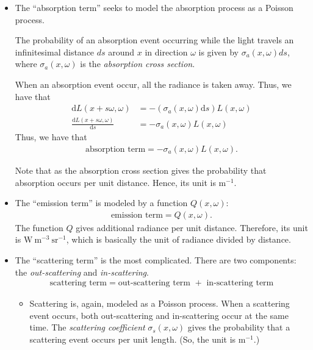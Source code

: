 \documentclass[10pt]{article}
\newcommand{\dee}{\mathrm{d}}
\begin{document}
\begin{itemize}
		\item The ``absorption term'' seeks to model the absorption process as a Poisson process.

			The probability of an absorption event occurring while the light travels an infinitesimal distance
			$ds$ around $x$ in direction $\omega$ is given by $\sigma_a(x, \omega) ds$, 
			where $\sigma_a(x, \omega)$ is the \emph{absorption cross section}.
			
			When an absorption event occur, all the radiance is taken away. Thus, we have that
			\begin{align*}
				\dee L(x + s\omega, \omega) &= -(\sigma_a(x, \omega) \dee s) L(x,\omega) \\
				\frac{\dee L(x + s\omega, \omega)}{\dee s} &=  -\sigma_a(x,\omega) L(x,\omega)
			\end{align*}
			Thus, we have that
			\begin{align*}
				\mbox{absorption term} = - \sigma_a(x, \omega) L(x, \omega) .
			\end{align*}

			Note that as the absorption cross section gives the probability that absorption occurs per unit distance. 
			Hence, its unit is $\mathrm{m}^{-1}$.
						
		\item The ``emission term'' is modeled by a function $Q(x, \omega)$:
			\begin{align*}
				\mbox{emission term} = Q(x,\omega).
			\end{align*}
			The function $Q$ gives additional radiance per unit distance. Therefore, its unit is
			$\mathrm{W}\ \mathrm{m}^{-3}\ \mathrm{sr}^{-1}$, which is basically the unit of radiance divided by distance.
			
		\item The ``scattering term'' is the most complicated. There are two components: the \emph{out-scattering}
			and \emph{in-scattering}.
			\begin{align*}
				\mbox{scattering term} = \mbox{out-scattering term } + \mbox{ in-scattering term}
			\end{align*}
			\begin{itemize}
				\item Scattering is, again, modeled as a Poisson process. When a scattering event occurs,
				both out-scattering and in-scattering occur at the same time.
				The \emph{scattering coefficient} $\sigma_s(x,\omega)$ gives the probability that a scattering 
				event occurs per unit length. (So, the unit is $\mathrm{m}^{-1}$.)
				

\end{itemize}
\end{itemize}
\end{document}
